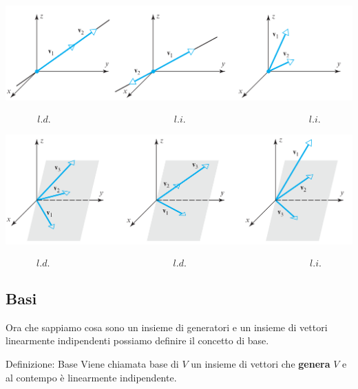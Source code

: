 \documentclass[x11names]{article}
\begin{document}
\begin{center}
\includegraphics[scale=0.22]{figures/linind.png}
\end{center}
$$
\begin{array}{ccc}
	l.d.\qquad \qquad \qquad \qquad \qquad \qquad& l.i. & \qquad \qquad \qquad \qquad \qquad \qquad l.i. 
\end{array}
$$ 
\begin{center}
\includegraphics[scale=0.22]{figures/linind2.png}
\end{center}
$$
\begin{array}{ccc}
	l.d.\qquad \qquad \qquad \qquad \qquad \qquad& l.d. & \qquad \qquad \qquad \qquad \qquad \qquad l.i. 
\end{array}
$$

\subsection{Basi}
Ora che sappiamo cosa sono un insieme di generatori e un insieme di vettori linearmente indipendenti possiamo definire il concetto di base.


\begin{center}
\colorbox{myblue}{\begin{minipage}{5.75in}
\begin{blues}{Definizione: Base}
Viene chiamata base di $V$ un insieme di vettori che \textbf{genera} $V$ e al contempo è linearmente indipendente.
\end{blues}
\end{minipage}}        
\end{center}
\end{document}
